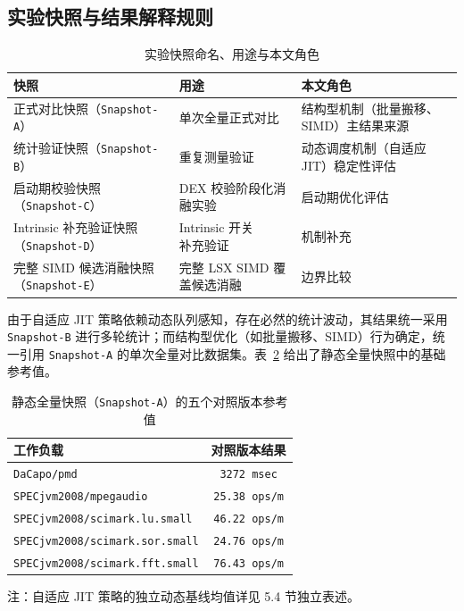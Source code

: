 \subsection{实验快照与结果解释规则}

\begin{table}[htbp]
    \centering
    \small
    \caption{实验快照命名、用途与本文角色}
    \label{tab:experiment-snapshots}
    \begin{tabular}{p{3.5cm}p{3.5cm}p{4.0cm}}
        \toprule
        \textbf{快照} & \textbf{用途} & \textbf{本文角色} \\
        \midrule
        正式对比快照（\texttt{Snapshot-A}） & 单次全量正式对比 & 结构型机制（批量搬移、SIMD）主结果来源 \\
        统计验证快照（\texttt{Snapshot-B}） & 重复测量验证 & 动态调度机制（自适应 JIT）稳定性评估 \\
        启动期校验快照（\texttt{Snapshot-C}） & DEX 校验阶段化消融实验 & 启动期优化评估 \\
        \shortstack[l]{Intrinsic 补充验证快照\\（\texttt{Snapshot-D}）} & \shortstack[l]{Intrinsic 开关\\补充验证} & 机制补充 \\
        完整 SIMD 候选消融快照（\texttt{Snapshot-E}） & 完整 LSX SIMD 覆盖候选消融 & 边界比较 \\
        \bottomrule
    \end{tabular}
\end{table}

由于自适应 JIT 策略依赖动态队列感知，存在必然的统计波动，其结果统一采用 \texttt{Snapshot-B} 进行多轮统计；而结构型优化（如批量搬移、SIMD）行为确定，统一引用 \texttt{Snapshot-A} 的单次全量对比数据集。表~\ref{tab:formal-baseline-values} 给出了静态全量快照中的基础参考值。

\begin{table}[htbp]
    \centering
    \small
    \caption{静态全量快照（\texttt{Snapshot-A}）的五个对照版本参考值}
    \label{tab:formal-baseline-values}
    \begin{tabular}{lc}
        \hline
        \textbf{工作负载} & \textbf{对照版本结果} \\
        \hline
        \texttt{DaCapo/pmd} & \texttt{3272\,msec} \\
        \texttt{SPECjvm2008/mpegaudio} & \texttt{25.38\,ops/m} \\
        \texttt{SPECjvm2008/scimark.lu.small} & \texttt{46.22\,ops/m} \\
        \texttt{SPECjvm2008/scimark.sor.small} & \texttt{24.76\,ops/m} \\
        \texttt{SPECjvm2008/scimark.fft.small} & \texttt{76.43\,ops/m} \\
        \hline
    \end{tabular}
    \par\vspace{0.5em}
    \footnotesize 注：自适应 JIT 策略的独立动态基线均值详见 5.4 节独立表述。
\end{table}

